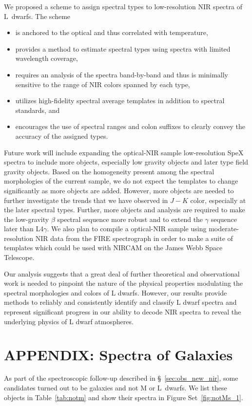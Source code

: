 \documentclass[12pt,preprint]{aastex}
\begin{document}
We proposed a scheme to assign spectral types to low-resolution NIR spectra of L~dwarfs.
The scheme
\begin{itemize}
\item is anchored to the optical and thus correlated with temperature,
\item provides a method to estimate spectral types using spectra with limited wavelength coverage,
\item requires an analysis of the spectra band-by-band and thus is minimally sensitive to the range of NIR colors spanned by each type,
\item utilizes high-fidelity spectral average templates in addition to spectral standards, and
\item encourages the use of spectral ranges and colon suffixes to clearly convey the accuracy of the assigned types.
\end{itemize}

Future work will include expanding the optical-NIR sample low-resolution SpeX spectra to include more objects, especially low gravity objects and later type field gravity objects.
Based on the homogeneity present among the spectral morphologies of the current sample, we do not expect the templates to change significantly as more objects are added.
However, more objects are needed to further investigate the trends that we have observed in $J-K$ color, especially at the later spectral types.
Further, more objects and analysis are required to make the low-gravity $\beta$ spectral sequence more robust and to extend the $\gamma$ sequence later than L4$\gamma$.
We also plan to compile a optical-NIR sample using moderate-resolution NIR data from the FIRE spectrograph in order to make a suite of templates which could be used with NIRCAM on the James Webb Space Telescope.

Our analysis suggests that a great deal of further theoretical and observational work is needed to pinpoint the nature of the physical properties modulating the spectral morphologies and colors of L dwarfs.
However, our results provide methods to reliably and consistently identify and classify L dwarf spectra and represent significant progress in our ability to decode NIR spectra to reveal the underlying physics of L dwarf atmospheres.

\appendix
\section{APPENDIX: Spectra of Galaxies}
\label{sec:galaxies}
As part of the spectroscopic follow-up described in \S~\ref{sec:obs_new_nir}, some candidates turned out to be galaxies and not M or L~dwarfs. We list these objects in Table~\ref{tab:notm} and show their spectra in Figure Set~\ref{fig:notMs_1}.
\end{document}

